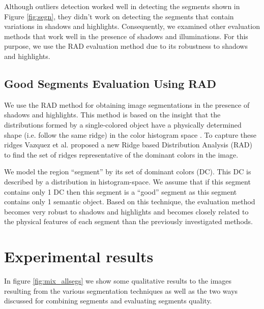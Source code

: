 \documentclass{llncs}
\begin{document}
Although outliers detection worked well in detecting the segments shown in Figure
\ref{fig:segn}, they didn't work on detecting the segments that contain variations
in shadows and highlights. Consequently, we examined other evaluation methods
that work well in the presence of shadows and illuminations. For this purpose, we use the
RAD evaluation method due to its robustness to shadows and highlights.

\subsection{Good Segments Evaluation Using RAD}

We use the RAD method \cite{1478239} for obtaining image
segmentations in the presence of shadows and highlights. This method is based on
the insight that the distributions formed by a single-colored object have a
physically determined shape (i.e. follow the same ridge) in the color histogram space \cite{Sha85}.
To capture these ridges Vazquez et al. \cite{1478239} proposed a new Ridge based
Distribution Analysis (RAD) to find the set of ridges representative of the dominant colors in the image.

We model the region ``segment'' by its set of dominant colors (DC). This DC is described
by a distribution in histogram-space. We assume that if this segment contains only 1 DC
then this segment is a ``good'' segment as this segment contains only 1 semantic object.
Based on this technique, the evaluation method becomes very robust to shadows and highlights
and becomes closely related to the physical features of each segment than the previously
investigated methods.

\section{Experimental results}

In figure \ref{fig:mix_allsegs} we show some qualitative results to the images resulting from the
various segmentation techniques as well as the two ways discussed for combining segments and
evaluating segments quality.
\end{document}
